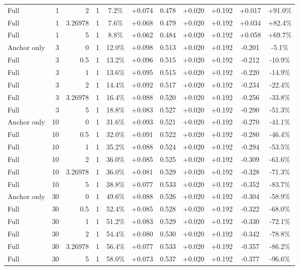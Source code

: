 \begin{table}[htbp]
\begin{tabular}{lrrrccccccc}
Full & 1 & 2 & 1 & 7.2\% & +0.074 & 0.478 & +0.020 & +0.192 & +0.017 & +91.0\% \\
Full & 1 & 3.26978 & 1 & 7.6\% & +0.068 & 0.479 & +0.020 & +0.192 & +0.034 & +82.4\% \\
Full & 1 & 5 & 1 & 8.8\% & +0.062 & 0.484 & +0.020 & +0.192 & +0.058 & +69.7\% \\
Anchor only & 3 & 0 & 1 & 12.0\% & +0.098 & 0.513 & +0.020 & +0.192 & -0.201 & -5.1\% \\
Full & 3 & 0.5 & 1 & 13.2\% & +0.096 & 0.515 & +0.020 & +0.192 & -0.212 & -10.9\% \\
Full & 3 & 1 & 1 & 13.6\% & +0.095 & 0.515 & +0.020 & +0.192 & -0.220 & -14.9\% \\
Full & 3 & 2 & 1 & 14.4\% & +0.092 & 0.517 & +0.020 & +0.192 & -0.234 & -22.4\% \\
Full & 3 & 3.26978 & 1 & 16.4\% & +0.088 & 0.520 & +0.020 & +0.192 & -0.256 & -33.8\% \\
Full & 3 & 5 & 1 & 18.8\% & +0.083 & 0.527 & +0.020 & +0.192 & -0.290 & -51.3\% \\
Anchor only & 10 & 0 & 1 & 31.6\% & +0.093 & 0.521 & +0.020 & +0.192 & -0.270 & -41.1\% \\
Full & 10 & 0.5 & 1 & 32.0\% & +0.091 & 0.522 & +0.020 & +0.192 & -0.280 & -46.4\% \\
Full & 10 & 1 & 1 & 35.2\% & +0.088 & 0.524 & +0.020 & +0.192 & -0.294 & -53.5\% \\
Full & 10 & 2 & 1 & 36.0\% & +0.085 & 0.525 & +0.020 & +0.192 & -0.309 & -61.6\% \\
Full & 10 & 3.26978 & 1 & 36.0\% & +0.081 & 0.529 & +0.020 & +0.192 & -0.328 & -71.3\% \\
Full & 10 & 5 & 1 & 38.8\% & +0.077 & 0.533 & +0.020 & +0.192 & -0.352 & -83.7\% \\
Anchor only & 30 & 0 & 1 & 49.6\% & +0.088 & 0.526 & +0.020 & +0.192 & -0.304 & -58.9\% \\
Full & 30 & 0.5 & 1 & 52.4\% & +0.085 & 0.528 & +0.020 & +0.192 & -0.322 & -68.0\% \\
Full & 30 & 1 & 1 & 51.2\% & +0.083 & 0.529 & +0.020 & +0.192 & -0.330 & -72.1\% \\
Full & 30 & 2 & 1 & 54.4\% & +0.080 & 0.530 & +0.020 & +0.192 & -0.342 & -78.8\% \\
Full & 30 & 3.26978 & 1 & 56.4\% & +0.077 & 0.533 & +0.020 & +0.192 & -0.357 & -86.2\% \\
Full & 30 & 5 & 1 & 58.0\% & +0.073 & 0.537 & +0.020 & +0.192 & -0.377 & -96.6\% \\

\end{tabular}
\end{table}
